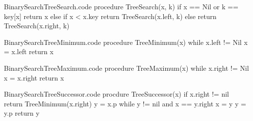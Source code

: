 \documentclass[a4paper]{article}
\begin{document}
\begin{filecontents*}[overwrite]{BinarySearchTreeSearch.code}
procedure TreeSearch(x, k)
    if x == Nil or k == key[x]
        return x
    else if x < x.key
        return TreeSearch(x.left, k)
    else
        return TreeSearch(x.right, k)
\end{filecontents*}



\begin{filecontents*}[overwrite]{BinarySearchTreeMinimum.code}
procedure TreeMinimum(x)
    while x.left != Nil
        x = x.left
    return x
\end{filecontents*}

\begin{filecontents*}[overwrite]{BinarySearchTreeMaximum.code}
procedure TreeMaximum(x)
    while x.right != Nil
        x = x.right
    return x
\end{filecontents*}


\begin{filecontents*}[overwrite]{BinarySearchTreeSuccessor.code}
procdure TreeSuccessor(x)
    if x.right != nil
        return TreeMinimum(x.right)
    y = x.p
    while y != nil and x == y.right
        x = y
        y = y.p
    return y
\end{filecontents*}
\end{document}
